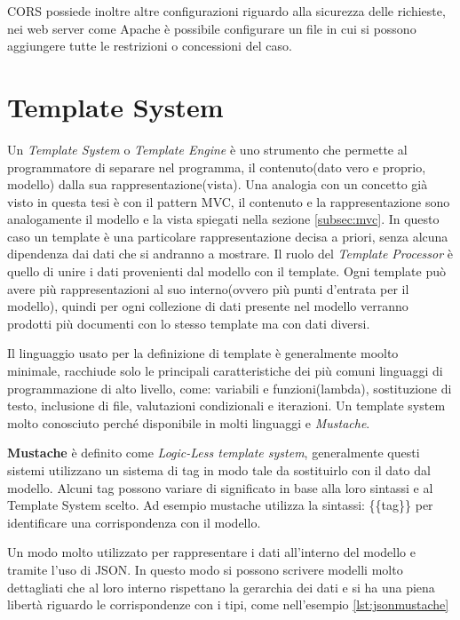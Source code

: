 CORS possiede inoltre altre configurazioni riguardo alla sicurezza delle richieste, nei web server come Apache è possibile configurare un file in cui si possono aggiungere tutte le restrizioni o concessioni del caso.

\section{Template System}

Un \textit{Template System} o \textit{Template Engine} è uno strumento che permette al programmatore di separare nel programma, il contenuto(dato vero e proprio, modello) dalla sua rappresentazione(vista). Una analogia con un concetto già visto in questa tesi è con il pattern MVC, il contenuto e la rappresentazione sono analogamente il modello e la vista spiegati nella sezione \ref{subsec:mvc}.
In questo caso un template è una particolare rappresentazione decisa a priori, senza alcuna dipendenza dai dati che si andranno a mostrare. Il ruolo del \emph{Template Processor} è quello di unire i dati provenienti dal modello con il template. Ogni template può avere più rappresentazioni al suo interno(ovvero più punti d'entrata per il modello), quindi per ogni collezione di dati presente nel modello verranno prodotti più documenti con lo stesso template ma con dati diversi.

Il linguaggio usato per la definizione di template è generalmente moolto minimale, racchiude solo le principali caratteristiche dei più comuni linguaggi di programmazione di alto livello, come: variabili e funzioni(lambda), sostituzione di testo, inclusione di file, valutazioni condizionali e iterazioni.
Un template system molto conosciuto perché disponibile in molti linguaggi e \textit{Mustache}.

\textbf{Mustache} è definito come \emph{Logic-Less template system}, generalmente questi sistemi utilizzano un sistema di tag in modo tale da sostituirlo con il dato dal modello. Alcuni tag possono variare di significato in base alla loro sintassi e al Template System scelto. Ad esempio mustache utilizza la sintassi: \{\{tag\}\} per identificare una corrispondenza con il modello.

Un modo molto utilizzato per rappresentare i dati all'interno del modello e tramite l'uso di JSON. In questo modo si possono scrivere modelli molto dettagliati che al loro interno rispettano la gerarchia dei dati e si ha una piena libertà riguardo le corrispondenze con i tipi, come nell'esempio \ref{lst:jsonmustache}

